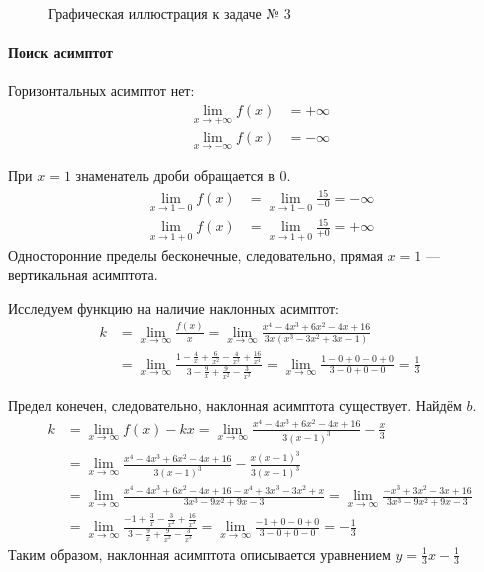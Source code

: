 \documentclass[a4paper,12pt]{article}
\begin{document}
\begin{figure}[htbp]
  \centering
  \caption{Графическая иллюстрация к задаче № 3}\label{fig:3}
\end{figure}

\paragraph{Поиск асимптот}

Горизонтальных асимптот нет:
\begin{align*}
  \lim_{x \to +\infty} f(x) &= +\infty \\
  \lim_{x \to -\infty} f(x) &= -\infty
\end{align*}

При \(x = 1\) знаменатель дроби обращается в 0.
\begin{align*}
  \lim_{x \to 1 - 0} f(x) &= \lim_{x \to 1 - 0} \frac{15}{-0} = -\infty \\
  \lim_{x \to 1 + 0} f(x) &= \lim_{x \to 1 + 0} \frac{15}{+0} = +\infty
\end{align*}
Односторонние пределы бесконечные, следовательно,
прямая \(x = 1\) --- вертикальная асимптота.

Исследуем функцию на наличие наклонных асимптот:
\begin{equation*}
\begin{split}
  k &= \lim_{x \to \infty} \frac{f(x)}{x}
     = \lim_{x \to \infty}
        \frac{x^4 - 4 x^3 + 6 x^2 - 4 x + 16}
             {3 x (x^3 - 3 x^2 + 3 x - 1)} \\
    &= \lim_{x \to \infty}
        \frac{1 - \frac{4}{x} + \frac{6}{x^2} - \frac{4}{x^3} + \frac{16}{x^4}}
             {3 - \frac{9}{x} + \frac{9}{x^2} - \frac{3}{x^3}}
     = \lim_{x \to \infty} \frac{1 - 0 + 0 - 0 + 0}{3 - 0 + 0 - 0}
     = \frac{1}{3}
\end{split}
\end{equation*}

Предел конечен, следовательно, наклонная асимптота существует.
Найдём \(b\).
\begin{equation*}
\begin{split}
  k &= \lim_{x \to \infty} f(x) - k x
     = \lim_{x \to \infty}
     \frac{x^4 - 4 x^3 + 6 x^2 - 4 x + 16} {3 {(x - 1)}^3}
     - \frac{x}{3} \\
    &= \lim_{x \to \infty}
     \frac{x^4 - 4 x^3 + 6 x^2 - 4 x + 16} {3 {(x - 1)}^3}
     - \frac{x {(x - 1)}^3}{3 {(x - 1)}^3} \\
    &= \lim_{x \to \infty}
     \frac{x^4 - 4 x^3 + 6 x^2 - 4 x + 16 - x^4 + 3 x^3 - 3 x^2 + x}
          {3 x^3 - 9 x^2 + 9 x - 3}
     = \lim_{x \to \infty}
     \frac{-x^3 + 3 x^2 - 3 x + 16}{3 x^3 - 9 x^2 + 9 x - 3} \\
    &= \lim_{x \to \infty}
     \frac{-1 + \frac{3}{x} - \frac{3}{x^2} + \frac{16}{x^3}}
          {3 - \frac{9}{x} + \frac{9}{x^2} - \frac{3}{x^3}}
     = \lim_{x \to \infty}
     \frac{-1 + 0 - 0 + 0}{3 - 0 + 0 - 0}
     = -\frac{1}{3}
\end{split}
\end{equation*}
Таким образом, наклонная асимптота описывается уравнением
\(y = \frac{1}{3} x - \frac{1}{3}\)
\end{document}
